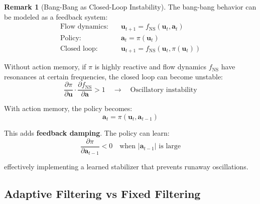 \documentclass[11pt,a4paper]{article}
\theoremstyle{definition}
\newtheorem{remark}{Remark}
\begin{document}
\begin{remark}[Bang-Bang as Closed-Loop Instability]
The bang-bang behavior can be modeled as a feedback system:
\begin{align}
    \text{Flow dynamics:} \quad &\mathbf{u}_{t+1} = f_{\text{NS}}(\mathbf{u}_t, \mathbf{a}_t) \\
    \text{Policy:} \quad &\mathbf{a}_t = \pi(\mathbf{u}_t) \\
    \text{Closed loop:} \quad &\mathbf{u}_{t+1} = f_{\text{NS}}(\mathbf{u}_t, \pi(\mathbf{u}_t))
\end{align}

Without action memory, if $\pi$ is highly reactive and flow dynamics $f_{\text{NS}}$ have resonances at certain frequencies, the closed loop can become unstable:
\begin{equation}
    \frac{\partial \pi}{\partial \mathbf{u}} \cdot \frac{\partial f_{\text{NS}}}{\partial \mathbf{a}} > 1 \quad \to \quad \text{Oscillatory instability}
\end{equation}

With action memory, the policy becomes:
\begin{equation}
    \mathbf{a}_t = \pi(\mathbf{u}_t, \mathbf{a}_{t-1})
\end{equation}

This adds \textbf{feedback damping}. The policy can learn:
\begin{equation}
    \frac{\partial \pi}{\partial \mathbf{a}_{t-1}} < 0 \quad \text{when } |\mathbf{a}_{t-1}| \text{ is large}
\end{equation}

effectively implementing a learned stabilizer that prevents runaway oscillations.
\end{remark}

\subsection{Adaptive Filtering vs Fixed Filtering}
\end{document}
